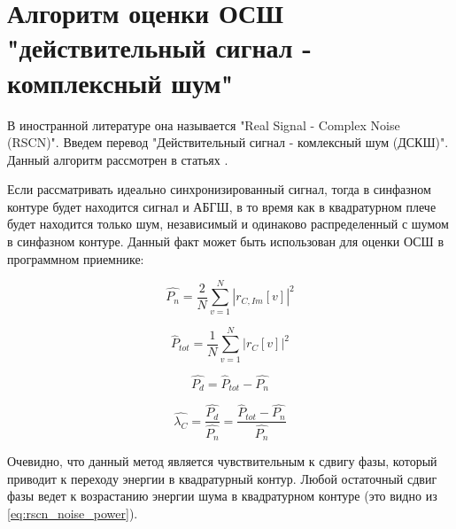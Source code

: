 \section{Алгоритм оценки ОСШ "действительный сигнал - комплексный шум"}

В иностранной литературе она называется "Real Signal - Complex Noise (RSCN)". Введем перевод
"Действительный сигнал - комлексный шум (ДСКШ)".
Данный алгоритм рассмотрен в статьях \cite{badke_rscn, presti_insidegnss, presti_ieee}.

Если рассматривать идеально синхронизированный сигнал, тогда в синфазном контуре будет
находится сигнал и АБГШ, в то время как в квадратурном плече будет находится только шум,
независимый и одинаково распределенный с шумом в синфазном контуре. Данный факт может
быть использован для оценки ОСШ в программном приемнике:
\begin{center}
\begin{equation}
	\label{eq:rscn_noise_power}
	\hat{P_n} = \frac{2}{N}\sum^N_{v=1}|r_{C,Im}[v]|^2
\end{equation}
\end{center}

\begin{center}
\begin{equation}
	\label{eq:rscn_total_power}
	\hat{P}_{tot} = \frac{1}{N}\sum^N_{v=1}|r_{C}[v]|^2
\end{equation}
\end{center}

\begin{center}
\begin{equation}
	\label{eq:rscn_data_power}
	\hat{P_d} = \hat{P}_{tot} - \hat{P_n}
\end{equation}
\end{center}

\begin{center}
\begin{equation}
	\label{eq:rscn_snr}
	\hat{\lambda_C} = \frac{\hat{P_d}}{\hat{P_n}} = \frac{\hat{P}_{tot} - \hat{P_n}}{\hat{P_n}} 
\end{equation}
\end{center}

Очевидно, что данный метод является чувствительным к сдвигу фазы, который приводит к переходу энергии
в квадратурный контур. Любой остаточный сдвиг фазы ведет к возрастанию энергии шума в квадратурном
контуре (это видно из \ref{eq:rscn_noise_power}).

\newpage
